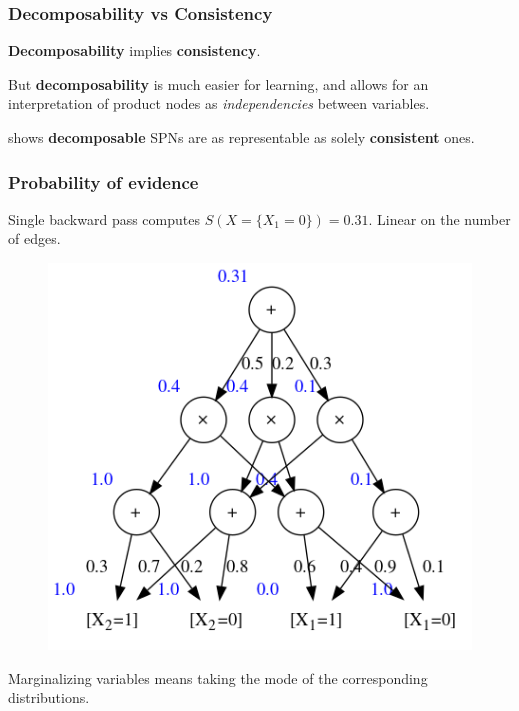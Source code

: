 \documentclass{beamer}
\begin{document}
\begin{frame}
  \frametitle{Decomposability vs Consistency}

  \textbf{Decomposability} implies \textbf{consistency}.
  \vfill

  But \textbf{decomposability} is much easier for learning, and allows for an interpretation of
  product nodes as \emph{independencies} between variables.
  \vfill

  \cite{theoretical-spn} shows \textbf{decomposable} SPNs are as representable as solely
  \textbf{consistent} ones.
\end{frame}

\begin{frame}
  \frametitle{Probability of evidence}

  Single backward pass computes $S(X=\{X_1=0\})=0.31$. Linear on the number of edges.

  \begin{figure}
    \centering\includegraphics[height=0.6\textheight]{imgs/sample_spn_prob.png}
  \end{figure}

  Marginalizing variables means taking the mode of the corresponding distributions.
\end{frame}
\end{document}

